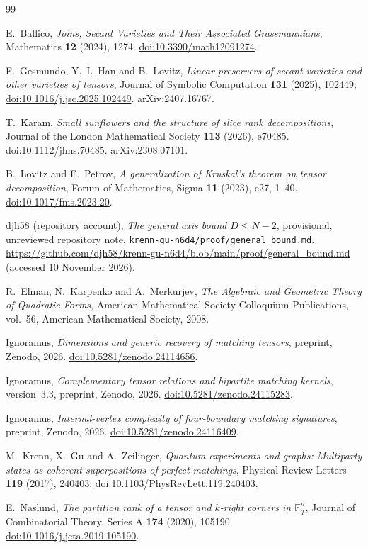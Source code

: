 \documentclass[11pt,letterpaper]{article}
\theoremstyle{definition}
\begin{document}
\begin{thebibliography}{99}
\raggedright
{}
E.~Ballico, \emph{Joins, Secant Varieties and Their Associated Grassmannians},
Mathematics \textbf{12} (2024), 1274.
\href{https://doi.org/10.3390/math12091274}{doi:10.3390/math12091274}.

F.~Gesmundo, Y.~I.~Han and B.~Lovitz,
\emph{Linear preservers of secant varieties and other varieties of tensors},
Journal of Symbolic Computation \textbf{131} (2025), 102449;
\href{https://doi.org/10.1016/j.jsc.2025.102449}{doi:10.1016/j.jsc.2025.102449}.
arXiv:2407.16767.

T.~Karam, \emph{Small sunflowers and the structure of slice rank decompositions},
Journal of the London Mathematical Society \textbf{113} (2026), e70485.
\href{https://doi.org/10.1112/jlms.70485}{doi:10.1112/jlms.70485}.
arXiv:2308.07101.

B.~Lovitz and F.~Petrov,
\emph{A generalization of Kruskal's theorem on tensor decomposition},
Forum of Mathematics, Sigma \textbf{11} (2023), e27, 1--40.
\href{https://doi.org/10.1017/fms.2023.20}{doi:10.1017/fms.2023.20}.

djh58 (repository account), \emph{The general axis bound \(D\le N-2\)},
provisional, unreviewed repository note,
\texttt{krenn-gu-n6d4/proof/general\_bound.md}.
\url{https://github.com/djh58/krenn-gu-n6d4/blob/main/proof/general_bound.md}
(accessed 10 November 2026).

R.~Elman, N.~Karpenko and A.~Merkurjev,
\emph{The Algebraic and Geometric Theory of Quadratic Forms},
American Mathematical Society Colloquium Publications, vol.~56,
American Mathematical Society, 2008.

Ignoramus, \emph{Dimensions and generic recovery of matching tensors},
preprint, Zenodo, 2026.
\href{https://doi.org/10.5281/zenodo.24114656}{doi:10.5281/zenodo.24114656}.

Ignoramus, \emph{Complementary tensor relations and bipartite matching
kernels}, version~3.3, preprint, Zenodo, 2026.
\href{https://doi.org/10.5281/zenodo.24115283}{doi:10.5281/zenodo.24115283}.

Ignoramus, \emph{Internal-vertex complexity of four-boundary matching
signatures}, preprint, Zenodo, 2026.
\href{https://doi.org/10.5281/zenodo.24116409}{doi:10.5281/zenodo.24116409}.

M.~Krenn, X.~Gu and A.~Zeilinger,
\emph{Quantum experiments and graphs: Multiparty states as coherent
superpositions of perfect matchings},
Physical Review Letters \textbf{119} (2017), 240403.
\href{https://doi.org/10.1103/PhysRevLett.119.240403}{doi:10.1103/PhysRevLett.119.240403}.

E.~Naslund,
\emph{The partition rank of a tensor and \(k\)-right corners in \(\mathbb F_q^n\)},
Journal of Combinatorial Theory, Series A \textbf{174} (2020), 105190.
\href{https://doi.org/10.1016/j.jcta.2019.105190}{doi:10.1016/j.jcta.2019.105190}.
\end{thebibliography}
\end{document}
